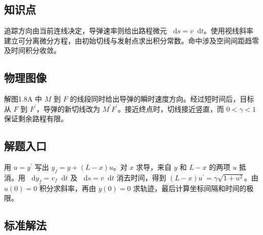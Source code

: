 \documentclass[UTF8,fontset=fandol,a4paper,11pt]{ctexart}
\newcommand{\dd}{\mathop{}\!\mathrm{d}}
\begin{document}


\subsection*{知识点}

追踪方向由当前连线决定，导弹速率则给出路程微元 $\dd s=v\dd t$。使用视线斜率建立可分离微分方程，由初始切线与发射点求出积分常数。命中涉及空间间距趋零及时间积分收敛。




\subsection*{物理图像}

解图1.8A 中 $M$ 到 $F$ 的线段同时给出导弹的瞬时速度方向。经过短时间后，目标从 $F$ 到 $F^{\prime}$，导弹的新切线改为 $M^{\prime}F^{\prime}$。接近终点时，切线接近竖直，而 $0<\gamma<1$ 保证剩余路程有限。



\subsection*{解题入口}

用 $u=y^{\prime}$ 写出 $y_f=y+(L-x)u$。对 $x$ 求导，来自 $y$ 和 $L-x$ 的两项 $u$ 抵消。用 $\dd y_f=v_f\dd t$ 及 $\dd s=v\dd t$ 消去时间，得到 $(L-x)u^{\prime}=\gamma\sqrt{1+u^2}$。由 $u(0)=0$ 积分求斜率，再由 $y(0)=0$ 求轨迹，最后计算坐标间隔和时间的极限。



\subsection*{标准解法}
\end{document}
